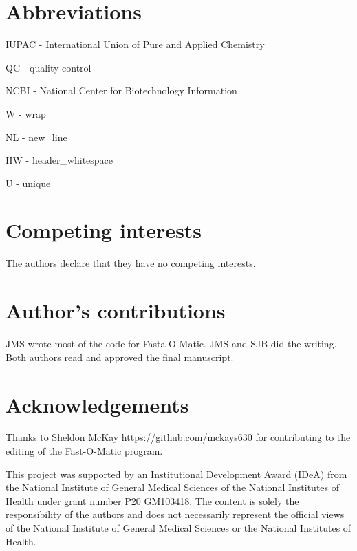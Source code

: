 \documentclass{bmcart}
\begin{document}
\begin{backmatter}

\section*{Abbreviations}

IUPAC - International Union of Pure and Applied Chemistry

QC - quality control

NCBI - National Center for Biotechnology Information

W - wrap

NL - new\_line

HW - header\_whitespace

U - unique


\section*{Competing interests}
  The authors declare that they have no competing interests.

\section*{Author's contributions}
    JMS wrote most of the code for Fasta-O-Matic. JMS and SJB did the writing. Both authors read and approved the final manuscript.

\section*{Acknowledgements}

Thanks to Sheldon McKay https://github.com/mckays630 for contributing to the editing of the Fast-O-Matic program.

This project was supported by an Institutional Development Award (IDeA) from the National Institute of General Medical Sciences of the National Institutes of Health under grant number P20 GM103418. The content is solely the responsibility of the authors and does not necessarily represent the official views of the National Institute of General Medical Sciences or the National Institutes of Health.



\end{backmatter}
\end{document}

